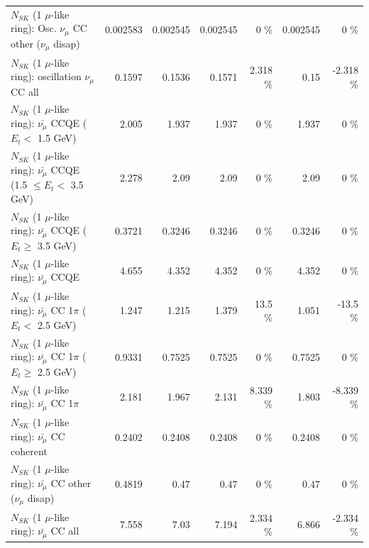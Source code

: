 \begin{table}
\begin{tabular}{| l | r | r | r  r | r  r |}
         $N_{SK}$ (1 $\mu$-like ring): Osc. $\nu_\mu$ CC other ($\nu_\mu$ disap) &        0.002583 &        0.002545 &        0.002545 &        0 \%  &        0.002545 &        0 \%  \\ 
                      $N_{SK}$ (1 $\mu$-like ring): oscillation $\nu_\mu$ CC all &          0.1597 &          0.1536 &          0.1571 &    2.318 \%  &            0.15 &   -2.318 \%  \\ 
\hline
\hline
          $N_{SK}$ (1 $\mu$-like ring): $\bar{\nu_\mu}$ CCQE ($E_{t} <$ 1.5 GeV) &           2.005 &           1.937 &           1.937 &        0 \%  &           1.937 &        0 \%  \\ 
 $N_{SK}$ (1 $\mu$-like ring): $\bar{\nu_\mu}$ CCQE (1.5 $\leq E_{t} <$ 3.5 GeV) &           2.278 &            2.09 &            2.09 &        0 \%  &            2.09 &        0 \%  \\ 
       $N_{SK}$ (1 $\mu$-like ring): $\bar{\nu_\mu}$ CCQE ($E_{t} \geq$ 3.5 GeV) &          0.3721 &          0.3246 &          0.3246 &        0 \%  &          0.3246 &        0 \%  \\ 
\hline
                              $N_{SK}$ (1 $\mu$-like ring): $\bar{\nu_\mu}$ CCQE &           4.655 &           4.352 &           4.352 &        0 \%  &           4.352 &        0 \%  \\ 
\hline
     $N_{SK}$ (1 $\mu$-like ring): $\bar{\nu_\mu}$ CC 1$\pi$ ($E_{t} <$ 2.5 GeV) &           1.247 &           1.215 &           1.379 &     13.5 \%  &           1.051 &    -13.5 \%  \\ 
  $N_{SK}$ (1 $\mu$-like ring): $\bar{\nu_\mu}$ CC 1$\pi$ ($E_{t} \geq$ 2.5 GeV) &          0.9331 &          0.7525 &          0.7525 &        0 \%  &          0.7525 &        0 \%  \\ 
\hline
                         $N_{SK}$ (1 $\mu$-like ring): $\bar{\nu_\mu}$ CC 1$\pi$ &           2.181 &           1.967 &           2.131 &    8.339 \%  &           1.803 &   -8.339 \%  \\ 
                       $N_{SK}$ (1 $\mu$-like ring): $\bar{\nu_\mu}$ CC coherent &          0.2402 &          0.2408 &          0.2408 &        0 \%  &          0.2408 &        0 \%  \\ 
        $N_{SK}$ (1 $\mu$-like ring): $\bar{\nu_\mu}$ CC other ($\nu_\mu$ disap) &          0.4819 &            0.47 &            0.47 &        0 \%  &            0.47 &        0 \%  \\ 
                          $N_{SK}$ (1 $\mu$-like ring): $\bar{\nu_{\mu}}$ CC all &           7.558 &            7.03 &           7.194 &    2.334 \%  &           6.866 &   -2.334 \%  \\ 

\end{tabular}
\end{table}
